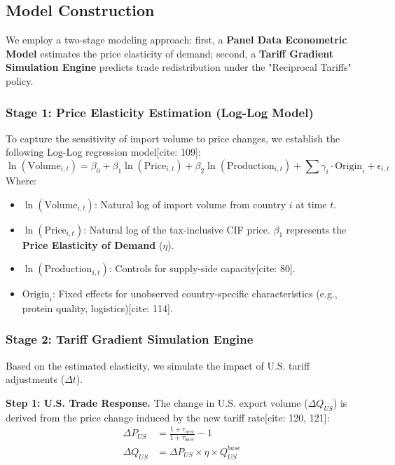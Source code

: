 \documentclass{apmcmthesis}
\begin{document}
\subsection{Model Construction}

We employ a two-stage modeling approach: first, a \textbf{Panel Data Econometric Model} estimates the price elasticity of demand; second, a \textbf{Tariff Gradient Simulation Engine} predicts trade redistribution under the "Reciprocal Tariffs" policy.

\subsubsection{Stage 1: Price Elasticity Estimation (Log-Log Model)}
To capture the sensitivity of import volume to price changes, we establish the following Log-Log regression model[cite: 109]:
\begin{equation}
    \ln(\text{Volume}_{i,t}) = \beta_0 + \beta_1 \ln(\text{Price}_{i,t}) + \beta_2 \ln(\text{Production}_{i,t}) + \sum \gamma_i \cdot \text{Origin}_i + \epsilon_{i,t}
    \label{eq:ols}
\end{equation}
Where:
\begin{itemize}
    \item $\ln(\text{Volume}_{i,t})$: Natural log of import volume from country $i$ at time $t$.
    \item $\ln(\text{Price}_{i,t})$: Natural log of the tax-inclusive CIF price. $\beta_1$ represents the \textbf{Price Elasticity of Demand} ($\eta$).
    \item $\ln(\text{Production}_{i,t})$: Controls for supply-side capacity[cite: 80].
    \item $\text{Origin}_i$: Fixed effects for unobserved country-specific characteristics (e.g., protein quality, logistics)[cite: 114].
\end{itemize}

\subsubsection{Stage 2: Tariff Gradient Simulation Engine}
Based on the estimated elasticity, we simulate the impact of U.S. tariff adjustments ($\Delta t$).

\textbf{Step 1: U.S. Trade Response.}
The change in U.S. export volume ($\Delta Q_{US}$) is derived from the price change induced by the new tariff rate[cite: 120, 121]:
\begin{align}
    \Delta P_{US} &= \frac{1 + \tau_{new}}{1 + \tau_{base}} - 1 \\
    \Delta Q_{US} &= \Delta P_{US} \times \eta \times Q_{US}^{base}
\end{align}
\end{document}
